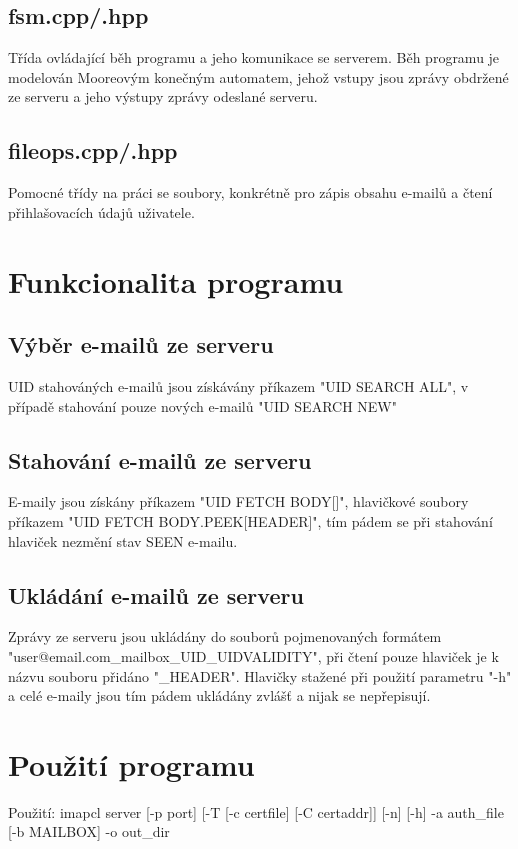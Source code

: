 \documentclass[]{report}
\begin{document}
\subsection{fsm.cpp/.hpp}
Třída ovládající běh programu a jeho komunikace se serverem. Běh programu je modelován Mooreovým konečným automatem, jehož vstupy jsou zprávy obdržené ze serveru a jeho výstupy zprávy odeslané serveru.
\subsection{fileops.cpp/.hpp}
Pomocné třídy na práci se soubory, konkrétně pro zápis obsahu e-mailů a čtení přihlašovacích údajů uživatele. 
\section{Funkcionalita programu}
\subsection{Výběr e-mailů ze serveru}
UID stahováných e-mailů jsou získávány příkazem "UID SEARCH ALL", v případě stahování pouze nových e-mailů "UID SEARCH NEW"
\subsection{Stahování e-mailů ze serveru}
E-maily jsou získány příkazem "UID FETCH BODY[]", hlavičkové soubory příkazem "UID FETCH BODY.PEEK[HEADER]", tím pádem se při stahování hlaviček nezmění stav SEEN e-mailu.
\subsection{Ukládání e-mailů ze serveru}
Zprávy ze serveru jsou ukládány do souborů pojmenovaných formátem "user@email.com\_mailbox\_UID\_UIDVALIDITY", při čtení pouze hlaviček je k názvu souboru přidáno "\_HEADER". Hlavičky stažené při použití parametru "-h" a celé e-maily jsou tím pádem ukládány zvlášť a nijak se nepřepisují.

\section{Použití programu}

Použití: imapcl server [-p port] [-T [-c certfile] [-C certaddr]] [-n] [-h] -a auth\_file [-b MAILBOX] -o out\_dir
\end{document}

